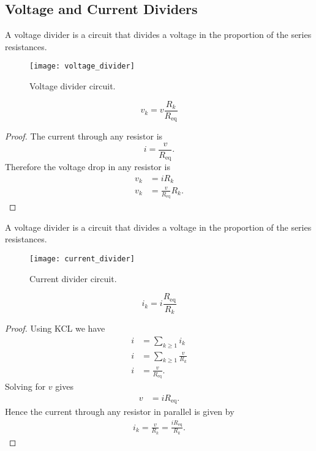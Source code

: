 \documentclass{article}
\begin{document}
\subsection{Voltage and Current Dividers}
\begin{definition}
    A voltage divider is a circuit that divides a voltage in the proportion of the series resistances.
\end{definition}
\begin{figure}[H]
    \centering
    \texttt{[image: voltage\_divider]}
    \caption{Voltage divider circuit.}
\end{figure}
\begin{theorem}
    \begin{equation*}
        v_k = v \frac{R_k}{R_{\mathrm{eq}}}
    \end{equation*}
\end{theorem}
\begin{proof}
    The current through any resistor is
    \begin{equation*}
        i = \frac{v}{R_{\mathrm{eq}}}.
    \end{equation*}
    Therefore the voltage drop in any resistor is
    \begin{align*}
        v_k & = i R_k                         \\
        v_k & = \frac{v}{R_{\mathrm{eq}}} R_k.
    \end{align*}
\end{proof}
\begin{definition}
    A voltage divider is a circuit that divides a voltage in the proportion of the series resistances.
\end{definition}
\begin{figure}[H]
    \centering
    \texttt{[image: current\_divider]}
    \caption{Current divider circuit.}
\end{figure}
\begin{theorem}
    \begin{equation*}
        i_k = i \frac{R_{\mathrm{eq}}}{R_k}
    \end{equation*}
\end{theorem}
\begin{proof}
    Using KCL we have
    \begin{align*}
        i & = \sum_{k\geq1} i_k           \\
        i & = \sum_{k\geq1} \frac{v}{R_k} \\
        i & = \frac{v}{R_{\mathrm{eq}}}.
    \end{align*}
    Solving for $v$ gives
    \begin{align*}
        v & = i R_{\mathrm{eq}}.
    \end{align*}
    Hence the current through any resistor in parallel is given by
    \begin{align*}
        i_k = \frac{v}{R_k} = \frac{iR_{\mathrm{eq}}}{R_k}.
    \end{align*}
\end{proof}
\newpage
\end{document}
